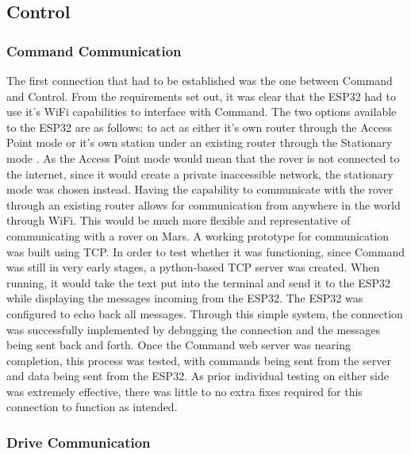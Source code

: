 \documentclass[a4paper]{article}
\begin{document}
\subsection{Control} 

\subsubsection{Command Communication}

The first connection that had to be established was the one between Command 
and Control. From the requirements set out, it was clear that the ESP32 
had to use it’s WiFi capabilities to interface with Command. The two 
options available to the ESP32 are as follows: to act as either it's own 
router through the Access Point mode or it's own station under an existing 
router through the Stationary mode \cite{ESPWIFI}. As the Access Point mode 
would mean that the rover is not connected to the internet, since 
it would create a private inaccessible network, the stationary mode was chosen 
instead. Having the capability to communicate with the rover through an 
existing router allows for communication from anywhere in the world 
through WiFi. This would be much more flexible and representative of 
communicating with a rover on Mars. A working prototype for communication 
was built using TCP. In order to test whether it was functioning, since 
Command was still in very early stages, a python-based TCP server was created. 
When running, it would take the text put into the terminal and send it 
to the ESP32 while displaying the messages incoming from the ESP32. 
The ESP32 was configured to echo back all messages. Through this 
simple system, the connection was successfully implemented by debugging 
the connection and the messages being sent back and forth. Once the 
Command web server was nearing completion, this process was tested, 
with commands being sent from the server and data being sent from the 
ESP32. As prior individual testing on either side was extremely 
effective, there was little to no extra fixes required for this 
connection to function as intended.

\subsubsection{Drive Communication}
\end{document}
